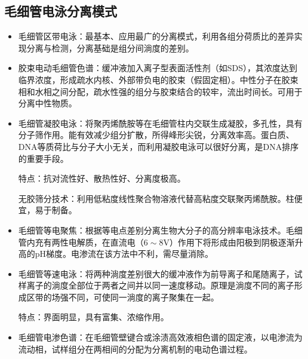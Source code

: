 \subsection{毛细管电泳分离模式}
\begin{itemize}
	\item 毛细管区带电泳：最基本、应用最广的分离模式，利用各组分荷质比的差异实现分离与检测，分离基础是组分间淌度的差别。
	\item 胶束电动毛细管色谱：缓冲液加入离子型表面活性剂（如SDS），其浓度达到临界浓度，形成疏水内核、外部带负电的胶束（假固定相）。中性分子在胶束相和水相之间分配，疏水性强的组分与胶束结合的较牢，流出时间长。可用于分离中性物质。
	\item 毛细管凝胶电泳：将聚丙烯酰胺等在毛细管柱内交联生成凝胶，多孔性，具有分子筛作用。能有效减少组分扩散，所得峰形尖锐，分离效率高。蛋白质、DNA等质荷比与分子大小无关，而利用凝胶电泳可以很好分离，是DNA排序的重要手段。

	特点：抗对流性好、散热性好、分离度极高。

	无胶筛分技术：利用低粘度线性聚合物溶液代替高粘度交联聚丙烯酰胺。柱便宜，易于制备。
	\item 毛细管等电聚焦：根据等电点差别分离生物大分子的高分辨率电泳技术。毛细管内充有两性电解质，在直流电（$6\sim 8\mathrm{V}$）作用下将形成由阳极到阴极逐渐升高的pH梯度。电渗流在该方法中不利，需尽量消除。
	\item 毛细管等速电泳：将两种淌度差别很大的缓冲液作为前导离子和尾随离子，试样离子的淌度全部位于两者之间并以同一速度移动。原理是淌度不同的离子形成区带的场强不同，可使同一淌度的离子聚集在一起。

	特点：界面明显，具有富集、浓缩作用。
	\item 毛细管电渗色谱：在毛细管壁键合或涂渍高效液相色谱的固定液，以电渗流为流动相，试样组分在两相间的分配为分离机制的电动色谱过程。
\end{itemize}